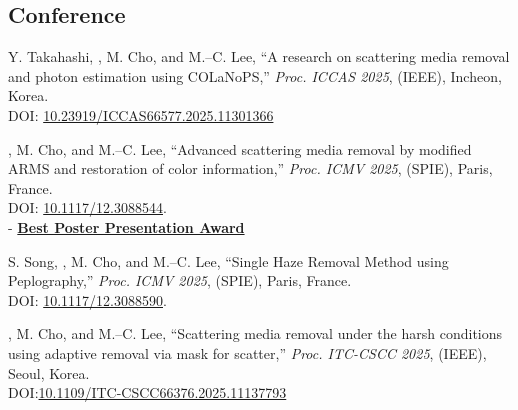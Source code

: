 \documentclass[a4paper,9pt]{extarticle}
\begin{document}
\subsection*{Conference}
\begin{enumerate}[label={[\arabic*]}, start=1]
    
    \item 
    Y. Takahashi, , M. Cho, and M.--C. Lee, 
    ``A research on scattering media removal and photon estimation using COLaNoPS,''
    \textit{Proc. ICCAS 2025}, (IEEE),
    Incheon, Korea. \\
    DOI: \href{https://doi.org/10.23919/ICCAS66577.2025.11301366}{10.23919/ICCAS66577.2025.11301366}

    \item 
    , M. Cho, and M.--C. Lee, 
    ``Advanced scattering media removal by modified ARMS and restoration of color information,'' 
    \textit{Proc. ICMV 2025}, (SPIE),
    Paris, France.  \\
    DOI: \href{https://doi.org/10.1117/12.3088544}{10.1117/12.3088544}. \\
    - \href{https://github.com/user-attachments/assets/53461ed5-0c97-4db9-8181-8551847832b3}{\textbf{Best Poster Presentation Award}}

    \item 
    S. Song, , M. Cho, and M.--C. Lee, 
    ``Single Haze Removal Method using Peplography,'' 
    \textit{Proc. ICMV 2025}, (SPIE),
    Paris, France. \\
    DOI: \href{https://doi.org/10.1117/12.3088590}{10.1117/12.3088590}.

    \item 
    , M. Cho, and M.--C. Lee, 
    ``Scattering media removal under the harsh conditions using adaptive removal via mask for scatter,'' 
    \textit{Proc. ITC-CSCC 2025}, (IEEE),
    Seoul, Korea. \\
    DOI:\href{https://doi.org/10.1109/ITC-CSCC66376.2025.11137793}{10.1109/ITC-CSCC66376.2025.11137793}
    

\end{enumerate}
\end{document}
